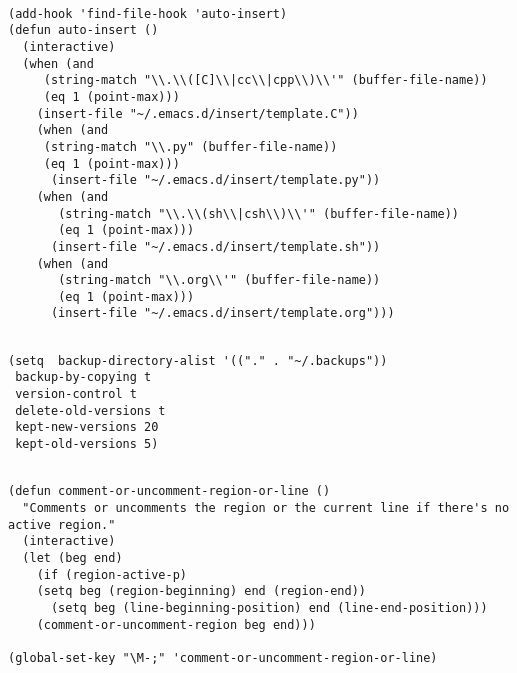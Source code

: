 \documentclass[11pt]{article}
\begin{document}
\begin{verbatim}

(add-hook 'find-file-hook 'auto-insert)
(defun auto-insert ()
  (interactive)
  (when (and 
	 (string-match "\\.\\([C]\\|cc\\|cpp\\)\\'" (buffer-file-name))
	 (eq 1 (point-max)))
    (insert-file "~/.emacs.d/insert/template.C"))
    (when (and 
	 (string-match "\\.py" (buffer-file-name))
	 (eq 1 (point-max)))
      (insert-file "~/.emacs.d/insert/template.py"))
    (when (and 
	   (string-match "\\.\\(sh\\|csh\\)\\'" (buffer-file-name))
	   (eq 1 (point-max)))
      (insert-file "~/.emacs.d/insert/template.sh"))
    (when (and 
	   (string-match "\\.org\\'" (buffer-file-name))
	   (eq 1 (point-max)))
      (insert-file "~/.emacs.d/insert/template.org")))

\end{verbatim}

\label{sec:orgc85cace}

\begin{verbatim}

(setq  backup-directory-alist '(("." . "~/.backups"))
 backup-by-copying t
 version-control t
 delete-old-versions t
 kept-new-versions 20
 kept-old-versions 5)

\end{verbatim}

\label{sec:org40344db}

\begin{verbatim}

(defun comment-or-uncomment-region-or-line ()
  "Comments or uncomments the region or the current line if there's no active region."
  (interactive)
  (let (beg end)
    (if (region-active-p)
	(setq beg (region-beginning) end (region-end))
      (setq beg (line-beginning-position) end (line-end-position)))
    (comment-or-uncomment-region beg end)))

(global-set-key "\M-;" 'comment-or-uncomment-region-or-line)

\end{verbatim}
\end{document}

